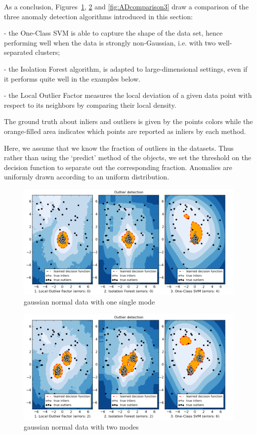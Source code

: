 As a conclusion,
Figures~\ref{fig:ADcomparison1}, \ref{fig:ADcomparison2} and \ref{fig:ADcomparison3} draw a comparison of the three anomaly detection algorithms introduced in this section:

- the One-Class SVM is able to capture the shape of the
  data set, hence performing well when the data is strongly
  non-Gaussian, i.e. with two well-separated clusters;

- the Isolation Forest algorithm, is adapted to
  large-dimensional settings, even if it performs quite well in the
  examples below.

- the Local Outlier Factor measures the local deviation of a given
  data point with respect to its neighbors by comparing their local density.

The ground truth about inliers and outliers is given by the points colors
while the orange-filled area indicates which points are reported as inliers
by each method.

Here, we assume that we know the fraction of outliers in the datasets.
Thus rather than using the `predict' method of the objects, we set the
threshold on the decision function to separate out the corresponding
fraction. Anomalies are uniformly drawn according to an uniform distribution.


\begin{figure}[H]
  \centering
  \includegraphics[width=.9\linewidth]{fig_source/ADcomparison1}
  \caption{gaussian normal data with one single mode}
  \label{fig:ADcomparison1}
\end{figure}

\begin{figure}[H]
  \centering
  \includegraphics[width=.9\linewidth]{fig_source/ADcomparison2}
  \caption{gaussian normal data with two modes}
  \label{fig:ADcomparison2}
\end{figure}

